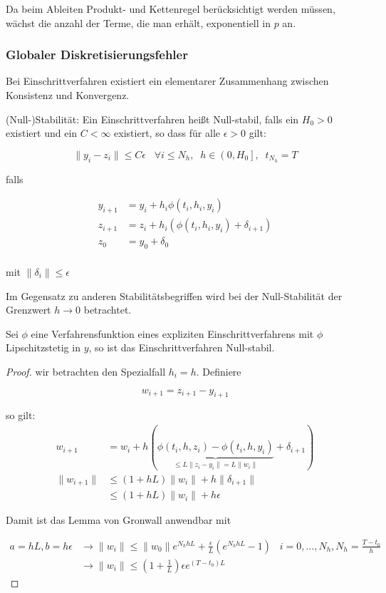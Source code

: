 Da beim Ableiten Produkt- und Kettenregel berücksichtigt werden müssen, wächst die anzahl der Terme, die man erhält, exponentiell in $p$ an.

\subsubsection{Globaler Diskretisierungsfehler}

Bei Einschrittverfahren existiert ein elementarer Zusammenhang zwischen Konsistenz und Konvergenz.

\begin{definition}[Definition IV.5] (Null-)Stabilität: Ein Einschrittverfahren heißt Null-stabil, falls ein $H_0 > 0$ existiert und ein $C < \infty$ existiert, so dass für alle $\epsilon > 0$ gilt:

	$$\|y_i - z_i\| \le C \epsilon \;\;\;\forall i \le N_h,\;\;h \in \left(0,H_0\right],\;\;t_{N_h} = T$$

	falls
	
	\begin{align*}
		y_{i+1} &= y_i + h_i \phi (t_i, h_i, y_i) \\
		z_{i+1} &= z_i + h_i (\phi (t_i, h_i, y_i) + \delta_{i+1}) \\
		z_0 &= y_0 + \delta_0 \\
	\end{align*}
	
	mit $\|\delta_i\| \le \epsilon$

\end{definition}


Im Gegensatz zu anderen Stabilitätsbegriffen wird bei der Null-Stabilität der Grenzwert $h \to 0$ betrachtet.

\begin{theorem}
	Sei $\phi$ eine Verfahrensfunktion eines expliziten Einschrittverfahrens mit $\phi$ Lipschitzstetig in $y$, so ist das Einschrittverfahren Null-stabil.
\end{theorem}

\begin{proof} wir betrachten den Spezialfall $h_i = h$. Definiere

	$$w_{i+1} = z_{i+1} - y_{i+1}$$

	so gilt:
	\begin{align*}
		w_{i+1} &= w_i + h(\underbrace{\phi(t_i, h, z_i) - \phi(t_i, h, y_i)}_{\le L \|z_i - y_i\| = L \|w_i\|} + \delta_{i+1})\\
		\|w_{i+1}\| &\le (1 + hL) \|w_i\| + h\|\delta_{i+1}\| \\
		& \le (1+hL)\|w_i\| + h\epsilon
	\end{align*}
	
	Damit ist das Lemma von Gronwall anwendbar mit 
	
	\begin{align*}
		a = hL, b = h\epsilon &\rightarrow \|w_i\| \le \|w_0\| e^{N_h hL} + \frac{\epsilon}{L}\left(e^{N_h hL} - 1\right) \;\;\; i = 0, \dots, N_h, N_h = \frac{T - t_0}{h}\\
		&\rightarrow \|w_i\| \le \left(1 + \frac{1}{L}\right) \epsilon e^{(T-t_0)L}
	\end{align*}
\end{proof}


